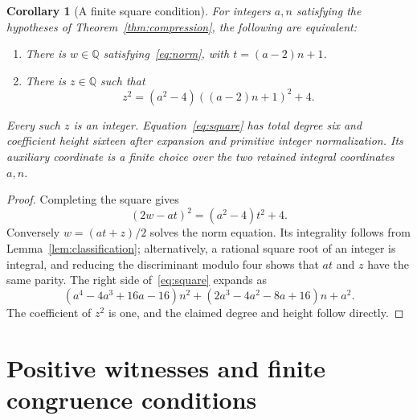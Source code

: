 \documentclass[11pt,a4paper]{article}
\newtheorem{corollary}[theorem]{Corollary}
\newcommand{\Q}{\mathbb Q}\newcommand{\Z}{\mathbb Z}
\begin{document}
\begin{corollary}[A finite square condition]\label{cor:square}
For integers $a,n$ satisfying the hypotheses of
Theorem~\ref{thm:compression}, the following are equivalent:
\begin{enumerate}
\item There is $w\in\Q$ satisfying~\eqref{eq:norm}, with
      $t=(a-2)n+1$.
\item There is $z\in\Q$ such that
\begin{equation}\label{eq:square}
          z^2=(a^2-4)((a-2)n+1)^2+4.
\end{equation}
\end{enumerate}
Every such $z$ is an integer. Equation~\eqref{eq:square} has total
degree six and coefficient height sixteen after expansion and primitive
integer normalization. Its auxiliary coordinate is a finite choice
over the two retained integral coordinates $a,n$.
\end{corollary}
\begin{proof}
Completing the square gives
\[
 (2w-at)^2=(a^2-4)t^2+4.
\]
Conversely $w=(at+z)/2$ solves the norm equation. Its integrality
follows from Lemma~\ref{lem:classification}; alternatively, a rational
square root of an integer is integral, and reducing the discriminant
modulo four shows that $at$ and $z$ have the same parity.
The right side of~\eqref{eq:square} expands as
\[
 (a^4-4a^3+16a-16)n^2
 +(2a^3-4a^2-8a+16)n+a^2.
\]
The coefficient of $z^2$ is one, and the claimed degree and height
follow directly.
\end{proof}

\section{Positive witnesses and finite congruence conditions}
\end{document}
